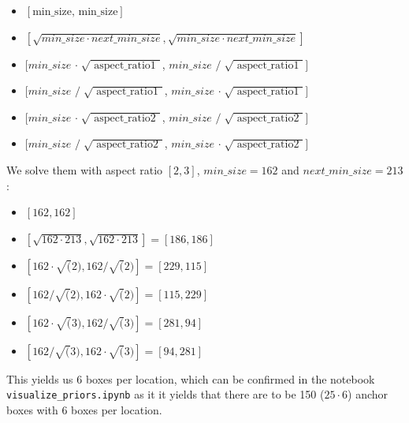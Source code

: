 \begin{itemize}
    \item $[\text{min\_size, min\_size}]$
    \item $[\sqrt{min\_size \cdot next\_min\_size}, \sqrt{min\_size \cdot next\_min\_size}]$
    \item $[min\_size$ $\cdot\; \sqrt{\text { aspect\_ratio1 }}$, $min\_size$ $/\; \sqrt{\text { aspect\_ratio1 }}]$
    \item $[min\_size$ $/\; \sqrt{\text { aspect\_ratio1 }}$, $min\_size$ $\cdot\; \sqrt{\text { aspect\_ratio1 }}]$
    \item $[min\_size$ $\cdot\; \sqrt{\text { aspect\_ratio2 }}$, $min\_size$ $/\; \sqrt{\text { aspect\_ratio2 }}]$
    \item $[min\_size$ $/\; \sqrt{\text { aspect\_ratio2 }}$, $min\_size$ $\cdot\; \sqrt{\text { aspect\_ratio2 }}]$
\end{itemize}

We solve them with aspect ratio $[2,3]$, $min\_size = 162$ and $next\_min\_size = 213$:
\begin{itemize}
    \item $[162, 162]$
    \item $[\sqrt{162 \cdot 213}, \sqrt{162 \cdot 213}] = [186, 186]$
    \item $[162\cdot\sqrt(2), 162/\sqrt(2)] = [229, 115]$
    \item $[162/\sqrt(2), 162\cdot\sqrt(2)] = [115, 229]$
    \item $[162\cdot\sqrt(3), 162/\sqrt(3)] = [281, 94]$
    \item $[162/\sqrt(3), 162\cdot\sqrt(3)] = [94, 281]$
\end{itemize}

This yields us 6 boxes per location, which can be confirmed in the notebook \newline
 \texttt{visualize\_priors.ipynb} as it it yields that there are to be 150 ($25 \cdot 6$) \newline 
 anchor boxes with 6 boxes per location.

